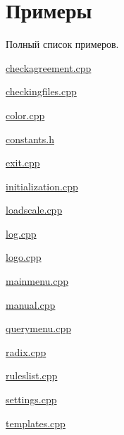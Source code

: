 \section{Примеры}
Полный список примеров.\begin{DoxyCompactItemize}
\item 
\hyperlink{checkagreement_8cpp-example}{checkagreement.\+cpp}
\item 
\hyperlink{checkingfiles_8cpp-example}{checkingfiles.\+cpp}
\item 
\hyperlink{color_8cpp-example}{color.\+cpp}
\item 
\hyperlink{constants_8h-example}{constants.\+h}
\item 
\hyperlink{exit_8cpp-example}{exit.\+cpp}
\item 
\hyperlink{initialization_8cpp-example}{initialization.\+cpp}
\item 
\hyperlink{loadscale_8cpp-example}{loadscale.\+cpp}
\item 
\hyperlink{log_8cpp-example}{log.\+cpp}
\item 
\hyperlink{logo_8cpp-example}{logo.\+cpp}
\item 
\hyperlink{mainmenu_8cpp-example}{mainmenu.\+cpp}
\item 
\hyperlink{manual_8cpp-example}{manual.\+cpp}
\item 
\hyperlink{querymenu_8cpp-example}{querymenu.\+cpp}
\item 
\hyperlink{radix_8cpp-example}{radix.\+cpp}
\item 
\hyperlink{ruleslist_8cpp-example}{ruleslist.\+cpp}
\item 
\hyperlink{settings_8cpp-example}{settings.\+cpp}
\item 
\hyperlink{templates_8cpp-example}{templates.\+cpp}
\end{DoxyCompactItemize}

